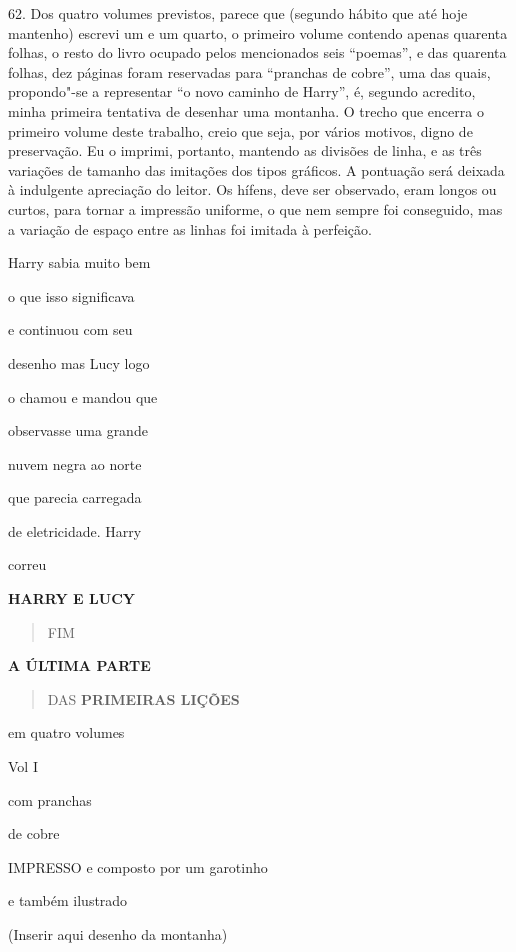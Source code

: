 62. Dos quatro volumes previstos, parece que (segundo hábito que até
hoje mantenho) escrevi um e um quarto, o primeiro volume contendo apenas
quarenta folhas, o resto do livro ocupado pelos mencionados seis
``poemas'', e das quarenta folhas, dez páginas foram reservadas para
``pranchas de cobre'', uma das quais, propondo"-se a representar ``o novo
caminho de Harry'', é, segundo acredito, minha primeira tentativa de
desenhar uma montanha. O trecho que encerra o primeiro volume deste
trabalho, creio que seja, por vários motivos, digno de preservação. Eu o
imprimi, portanto, mantendo as divisões de linha, e as três variações de
tamanho das imitações dos tipos gráficos. A pontuação será deixada à
indulgente apreciação do leitor. Os hífens, deve ser observado, eram
longos ou curtos, para tornar a impressão uniforme, o que nem sempre foi
conseguido, mas a variação de espaço entre as linhas foi imitada à
perfeição.

Harry sabia muito bem

o que isso significava

e continuou com seu

desenho mas Lucy logo

o chamou e mandou que

observasse uma grande

nuvem negra ao norte

que parecia carregada

de eletricidade. Harry

correu

\textbf{HARRY E LUCY}

\begin{quote}
FIM
\end{quote}

\textbf{A ÚLTIMA PARTE}

\begin{quote}
DAS \textbf{PRIMEIRAS LIÇÕES}
\end{quote}

em quatro volumes

Vol I

com pranchas

de cobre

IMPRESSO e composto por um garotinho

e também ilustrado

(Inserir aqui desenho da montanha)

